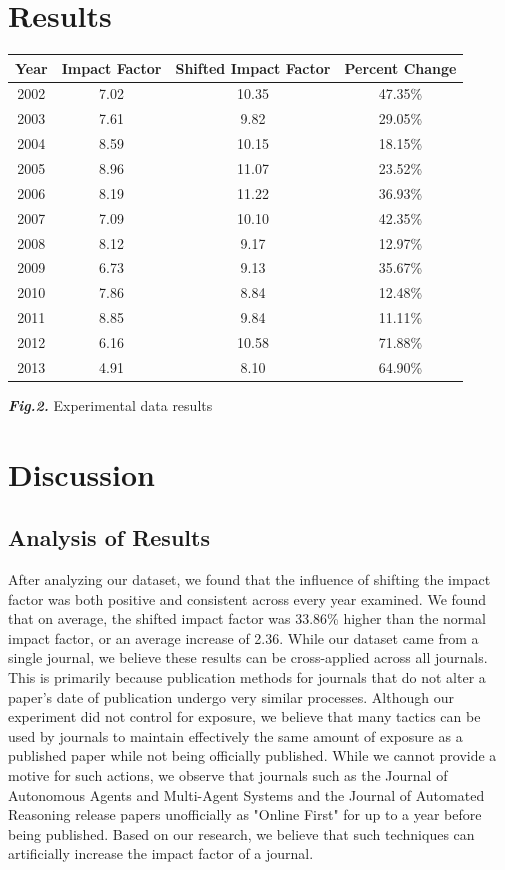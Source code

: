 \documentclass[jair,twoside,11pt,theapa]{article}
\begin{document}
\section{Results}
\begin{center}
 \begin{tabular}{| c | c | c | c |} 
 \hline
 Year & Impact Factor & Shifted Impact Factor & Percent Change \\ 
 \hline\hline
 2002 & 7.02 & 10.35 & 47.35\%\\ 
 \hline
 2003 & 7.61 & 9.82 & 29.05\%\\
 \hline
 2004 & 8.59 & 10.15 & 18.15\%\\
 \hline
 2005 & 8.96 & 11.07 & 23.52\%\\
 \hline
 2006 & 8.19 & 11.22 & 36.93\%\\ 
 \hline
 2007 & 7.09 & 10.10 & 42.35\%\\ 
 \hline
 2008 & 8.12 & 9.17 & 12.97\%\\ 
 \hline
 2009 & 6.73 & 9.13 & 35.67\%\\ 
 \hline
 2010 & 7.86 & 8.84 & 12.48\%\\ 
 \hline
 2011 & 8.85 & 9.84 & 11.11\%\\ 
 \hline
 2012 & 6.16 & 10.58 & 71.88\%\\ 
 \hline
 2013 & 4.91 & 8.10 & 64.90\%\\ 
 \hline
\end{tabular}

\end{center}
\textbf{\textit{Fig.2.}}\hspace{.1cm} Experimental data results


\section{Discussion} 
\subsection{Analysis of Results}

After analyzing our dataset, we found that the influence of shifting the impact factor was both positive and consistent across every year examined. We found that on average, the shifted impact factor was 33.86\% higher than the normal impact factor, or an average increase of 2.36. While our dataset came from a single journal, we believe these results can be cross-applied across all journals. This is primarily because publication methods for journals that do not alter a paper's date of publication undergo very similar processes. Although our experiment did not control for exposure, we believe that many tactics can be used by journals to maintain effectively the same amount of exposure as a published paper while not being officially published. While we cannot provide a motive for such actions, we observe that journals such as the Journal of Autonomous Agents and Multi-Agent Systems and the Journal of Automated Reasoning release papers unofficially as "Online First" for up to a year before being published. Based on our research, we believe that such techniques can artificially increase the impact factor of a journal. 
\end{document}
